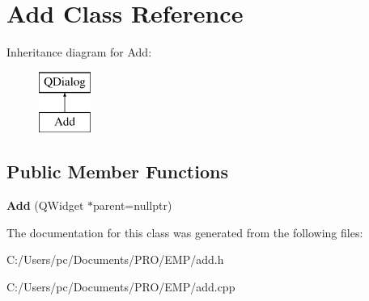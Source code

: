 \hypertarget{class_add}{}\section{Add Class Reference}
\label{class_add}
Inheritance diagram for Add\+:\begin{figure}[H]
\begin{center}
\leavevmode
\includegraphics[height=2.000000cm]{class_add}
\end{center}
\end{figure}
\subsection*{Public Member Functions}
\begin{DoxyCompactItemize}
\item 
\mbox{\label{class_add_a2339f812c92e0fe5341df70de15e1efe}} 
{\bfseries Add} (Q\+Widget $\ast$parent=nullptr)
\end{DoxyCompactItemize}


The documentation for this class was generated from the following files\+:\begin{DoxyCompactItemize}
\item 
C\+:/\+Users/pc/\+Documents/\+P\+R\+O/\+E\+M\+P/add.\+h\item 
C\+:/\+Users/pc/\+Documents/\+P\+R\+O/\+E\+M\+P/add.\+cpp\end{DoxyCompactItemize}
